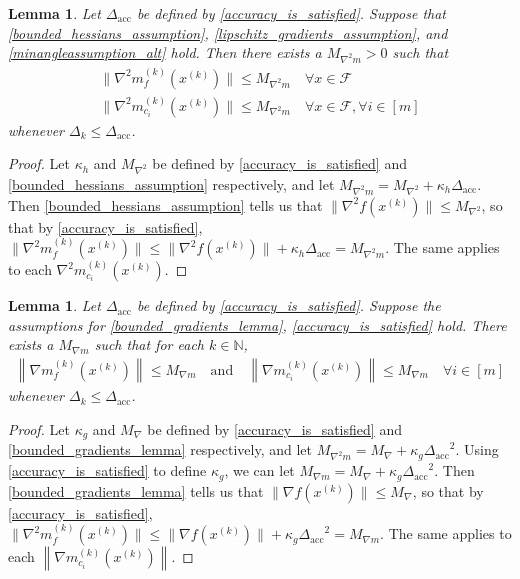 \documentclass{article}
\newtheorem{lemma}[theorem]{Lemma}
\theoremstyle{case}
\numberwithin{theorem}{subsection}
\newcommand{\dacc}{{\Delta_{\textrm{acc}}}}
\newcommand{\dk}{\Delta_k}
\newcommand{\feasible}{{\mathcal F}}
\newcommand{\gk}{{\nabla m_f^{(k)}\left(\xk\right)}}
\newcommand{\gmcik}{{\nabla m_{c_i}^{(k)}\left(\xk\right)}}
\newcommand{\hk}{{\nabla^2m_f^{(k)}\left(\xk\right)}}
\newcommand{\maxgrad}{{M_{\nabla}}}
\newcommand{\maxhessian}{{M_{\nabla^2}}}
\newcommand{\maxmodelhessian}{{M_{\nabla^2 m}}}
\newcommand{\naturals}{\mathbb N}
\newcommand{\xk}{x^{(k)}}
\newcommand{\maxmodelgrad}{{M_{\nabla m}}}
\begin{document}
\begin{lemma}
\label{bounded_model_hessian_lemma}
Let $\dacc$ be defined by \cref{accuracy_is_satisfied}.
Suppose that \cref{bounded_hessians_assumption}, \cref{lipschitz_gradients_assumption}, and \cref{minangleassumption_alt} hold.
Then there exists a $\maxmodelhessian > 0$ such that 
\begin{align*}
\| \hk \| \le \maxmodelhessian \quad \forall x \in \feasible \\
\|\nabla^2 m_{c_i}^{(k)}(\xk) \| \le \maxmodelhessian \quad \forall x \in \feasible, \forall i \in [m]
\end{align*}
whenever $\dk \le \dacc$.
\end{lemma}

\begin{proof}
Let $\kappa_h$ and $\maxhessian$ be defined by \cref{accuracy_is_satisfied} and \cref{bounded_hessians_assumption} respectively,
and let $\maxmodelhessian = \maxhessian + \kappa_h \dacc$.
Then \cref{bounded_hessians_assumption} tells us that
$\|\nabla^2 f(\xk)\| \le \maxhessian$, so that by \cref{accuracy_is_satisfied},
$\|\hk\| \le \|\nabla^2 f(\xk)\| + \kappa_h\dacc = \maxmodelhessian$.
The same applies to each $\nabla^2 m_{c_i}^{(k)}(\xk)$.
\end{proof}

\begin{lemma}
\label{i_thought_i_proved_this_already}
Let $\dacc$ be defined by \cref{accuracy_is_satisfied}.
Suppose the assumptions for
\cref{bounded_gradients_lemma},
\cref{accuracy_is_satisfied}
hold.
There exists a $\maxmodelgrad$ such that for each $k \in \naturals$, 
\begin{align*}
\left\| \gk \right\| \le \maxmodelgrad \quad
\textrm{and} \quad \left\|\gmcik\right\| \le \maxmodelgrad \quad \forall i \in [m]
\end{align*}
whenever $\dk \le \dacc$.
\end{lemma}
\begin{proof}
Let $\kappa_g$ and $\maxgrad$ be defined by \cref{accuracy_is_satisfied} and \cref{bounded_gradients_lemma} respectively,
and let $\maxmodelhessian = \maxgrad + \kappa_g \dacc^2$.
Using \cref{accuracy_is_satisfied} to define $\kappa_g$, we can let $\maxmodelgrad = \maxgrad + \kappa_g \dacc^2$.
Then \cref{bounded_gradients_lemma} tells us that
$\|\nabla f(\xk)\| \le \maxgrad$, so that by \cref{accuracy_is_satisfied},
$\|\hk\| \le \|\nabla f(\xk)\| + \kappa_g\dacc^2 = \maxmodelgrad$.
The same applies to each $\left\|\gmcik\right\|$.
\end{proof}
\end{document}
